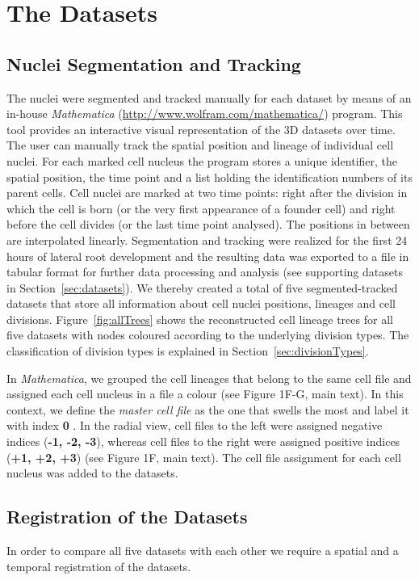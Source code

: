 \documentclass[11pt,a4paper, final]{article}
\begin{document}
\clearpage
\section{The Datasets}
\subsection{Nuclei Segmentation and Tracking}
\label{sec:segmentation}
\noindent
The nuclei were segmented and tracked manually for each dataset by means of an in-house \textit{Mathematica} (\href{http://www.wolfram.com/mathematica/}{http://www.wolfram.com/mathematica/}) program. This tool provides an interactive visual representation of the 3D datasets over time. The user can manually track the spatial position and lineage of individual cell nuclei. For each marked cell nucleus the program stores a unique identifier, the spatial position, the time point and a list holding the identification numbers of its parent cells. Cell nuclei are marked at two time points: right after the division in which the cell is born (or the very first appearance of a founder cell) and right before the cell divides (or the last time point analysed). The positions in between are interpolated linearly. Segmentation and tracking were realized for the first 24 hours of lateral root development and the resulting data was exported to a file in tabular format for further data processing and analysis (see supporting datasets in Section~\ref{sec:datasets}). We thereby created a total of five segmented-tracked datasets that store all information about cell nuclei positions, lineages and cell divisions. Figure~\ref{fig:allTrees} shows the reconstructed cell lineage trees for all five datasets with nodes coloured according to the underlying division types. The classification of division types is explained in Section~\ref{sec:divisionTypes}.

In \textit{Mathematica}, we grouped the cell lineages that belong to the same cell file and assigned each cell nucleus in a file a colour (see Figure 1F-G, main text). In this context, we define the \textit{master cell file} as the one that swells the most and label it with index \textbf{0} \cite{Vermeer:2014fl}. In the radial view, cell files to the left were assigned negative indices (\textbf{-1, -2, -3}), whereas cell files to the right were assigned positive indices (\textbf{+1, +2, +3}) (see Figure 1F, main text). The cell file assignment for each cell nucleus was added to the datasets.

\subsection{Registration of the Datasets}
\label{sec:registration}
\noindent
In order to compare all five datasets with each other we require a spatial and a temporal registration of the datasets. 
\end{document}
